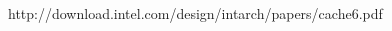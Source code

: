 \documentclass[conference]{IEEEtran}
\begin{document}


%
%







%
%
%
\begin{thebibliography}{1}

http://download.intel.com/design/intarch/papers/cache6.pdf


\end{thebibliography}




\end{document}

